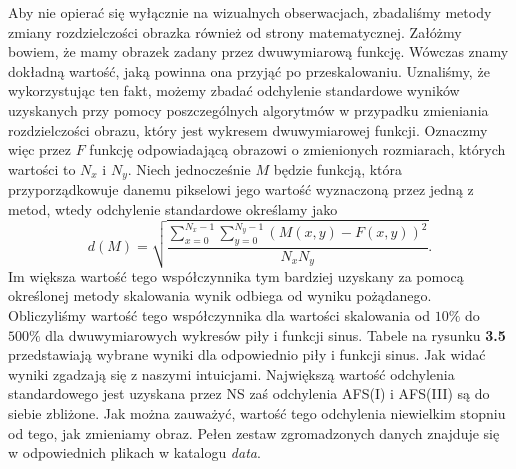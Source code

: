 Aby nie opierać się wyłącznie na wizualnych obserwacjach, zbadaliśmy
metody zmiany rozdzielczości obrazka również od strony matematycznej. Załóżmy
bowiem, że mamy obrazek zadany przez dwuwymiarową funkcję. Wówczas znamy
dokładną wartość, jaką powinna ona przyjąć po przeskalowaniu. Uznaliśmy, że
wykorzystując ten fakt, możemy zbadać odchylenie standardowe wyników uzyskanych przy pomocy
poszczególnych algorytmów w przypadku zmieniania rozdzielczości obrazu, który jest
wykresem dwuwymiarowej funkcji. Oznaczmy więc przez $F$ funkcję odpowiadającą
obrazowi o zmienionych rozmiarach, których wartości to $N_x$ i $N_y$. Niech
jednocześnie $M$ będzie funkcją, która przyporządkowuje danemu pikselowi jego
wartość wyznaczoną przez jedną z metod, wtedy odchylenie standardowe określamy
jako
$$d(M)=\sqrt{\frac{\sum_{x=0}^{N_x-1}{\sum_{y=0}^{N_y-1}{(M(x,y)-F(x,y))^2}}}{N_xN_y}}.$$
Im większa wartość tego współczynnika tym bardziej uzyskany za pomocą określonej
metody skalowania wynik odbiega od wyniku pożądanego. Obliczyliśmy wartość tego
współczynnika dla wartości skalowania od $10\%$ do $500\%$ dla dwuwymiarowych
wykresów piły i funkcji sinus. Tabele na rysunku \textbf{3.5}
przedstawiają wybrane wyniki dla odpowiednio piły i funkcji sinus.
Jak widać wyniki zgadzają się z naszymi intuicjami. Największą wartość odchylenia
standardowego jest uzyskana przez NS zaś odchylenia AFS(I) i AFS(III) są do siebie zbliżone. Jak można
zauważyć, wartość tego odchylenia niewielkim stopniu od tego, jak zmieniamy obraz.
Pełen zestaw zgromadzonych danych znajduje się w odpowiednich plikach w katalogu
\textit{data}.
